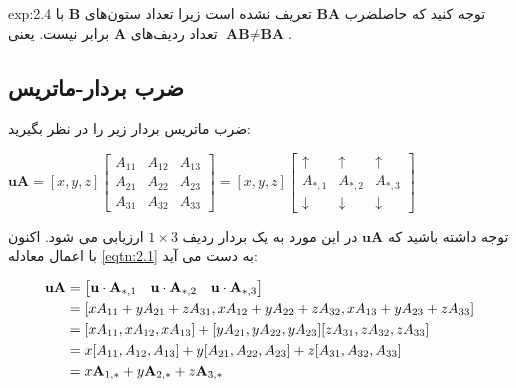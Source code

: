 {\begin{spacing}{1.5}
\begin{example}{exp:2.4}
            توجه کنید که حاصلضرب $\textbf{BA}$ تعریف نشده است زیرا تعداد ستون‌های $\textbf{B}$ با تعداد ردیف‌های $\textbf{A}$ برابر نیست. یعنی $\textbf{AB}\neq\textbf{BA}$.
        \end{example}

    \end{spacing}
}

\subsection{\textbf{ضرب بردار-ماتریس}}
{
    \Large
    \begin{spacing}{1.5}
        ضرب ماتریس بردار زیر را در نظر بگیرید:

        \begin{center}
            $\textbf{uA}=[x,y,z]\begin{bmatrix}
                                    A_{11} & A_{12} & A_{13} \\
                                    A_{21} & A_{22} & A_{23} \\
                                    A_{31} & A_{32} & A_{33}
            \end{bmatrix}=[x,y,z]\begin{bmatrix}
                                     \uparrow   & \uparrow   & \uparrow   \\
                                     A_{*,1}    & A_{*,2}    & A_{*,3}    \\
                                     \downarrow & \downarrow & \downarrow
            \end{bmatrix}$
        \end{center}

        توجه داشته باشید که $\textbf{uA}$ در این مورد به یک بردار ردیف $1\times 3$ ارزیابی می شود.
        اکنون با اعمال معادله \ref{eqtn:2.1} به دست می آید:

        \begin{equation*}
            \centering
            \begin{split}
                \textbf{uA}&=\begin{bmatrix}
                                 \textbf{u}\cdot\textbf{A}_{*,1} & \textbf{u}\cdot\textbf{A}_{*,2} & \textbf{u}\cdot\textbf{A}_{*,3}
                \end{bmatrix}\\
                &=[xA_{11}+yA_{21}+zA_{31}, xA_{12}+yA_{22}+zA_{32}, xA_{13}+yA_{23}+zA_{33}] \\
                &=[xA_{11},xA_{12},xA_{13}]+[yA_{21},yA_{22},yA_{23}][zA_{31},zA_{32},zA_{33}] \\
                &=x[A_{11},A_{12},A_{13}]+y[A_{21},A_{22},A_{23}]+z[A_{31},A_{32},A_{33}] \\
                &=x\textbf{A}_{1,*}+y\textbf{A}_{2,*}+z\textbf{A}_{3,*}
            \end{split}
        \end{equation*}


\end{spacing}}
